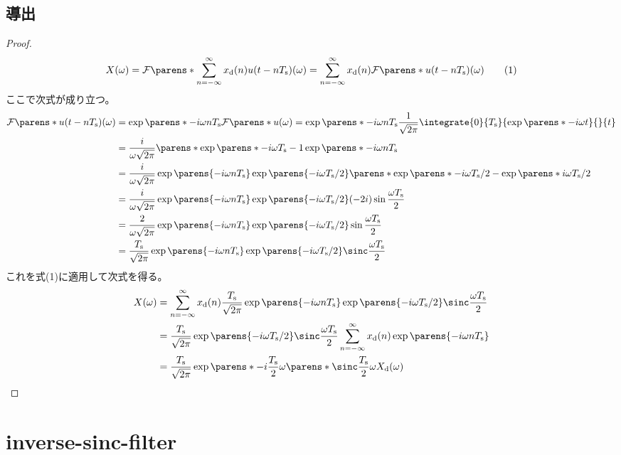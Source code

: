         \subsection{導出}
            \begin{proof}
                \quad\par
                \[ X(\omega) = \FT{\sum_{n=-\infty}^\infty \xd(n)u(t-n\Ts)}(\omega) = \sum_{n=-\infty}^\infty \xd(n)\FT{u(t-n\Ts)}(\omega) \tag{1} \]
                ここで次式が成り立つ。
                \begin{align*}
                    \FT{u(t-n\Ts)}(\omega) &= \exp\parens*{-i \omega n\Ts}\FT{u}(\omega) = \exp\parens*{-i \omega n\Ts}\frac{1}{\sqrt{2\pi}}\integrate{0}{\Ts}{\exp\parens*{-i\omega t}}{}{t} \\
                    &= \frac{i}{\omega\sqrt{2\pi}}\parens*{\exp\parens*{-i \omega\Ts}-1}\exp\parens*{-i \omega n\Ts} \\
                    &= \frac{i}{\omega\sqrt{2\pi}}\exp\parens{-i \omega n\Ts}\exp\parens{-i \omega\Ts/2}\parens*{\exp\parens*{-i \omega\Ts/2} - \exp\parens*{i \omega\Ts/2}} \\
                    &= \frac{i}{\omega\sqrt{2\pi}}\exp\parens{-i \omega n\Ts}\exp\parens{-i \omega\Ts/2}(-2i)\sin\frac{\omega\Ts}{2} \\
                    &= \frac{2}{\omega\sqrt{2\pi}}\exp\parens{-i \omega n\Ts}\exp\parens{-i \omega\Ts/2}\sin\frac{\omega\Ts}{2} \\
                    &= \frac{\Ts}{\sqrt{2\pi}}\exp\parens{-i \omega n\Ts}\exp\parens{-i \omega\Ts/2}\sinc\frac{\omega\Ts}{2}
                \end{align*}
                これを式(1)に適用して次式を得る。
                \begin{align*}
                    X(\omega) &= \sum_{n=-\infty}^\infty \xd(n)\frac{\Ts}{\sqrt{2\pi}}\exp\parens{-i \omega n\Ts}\exp\parens{-i \omega\Ts/2}\sinc\frac{\omega\Ts}{2} \\
                    &= \frac{\Ts}{\sqrt{2\pi}}\exp\parens{-i \omega\Ts/2}\sinc\frac{\omega\Ts}{2} \sum_{n=-\infty}^\infty \xd(n)\exp\parens{-i \omega n\Ts} \\
                    &= \frac{\Ts}{\sqrt{2\pi}}\exp\parens*{-i\frac{\Ts}{2}\omega}\parens*{\sinc \frac{\Ts}{2}\omega}\Xd(\omega)
                \end{align*}
            \end{proof}
    \section{inverse-sinc-filter}
